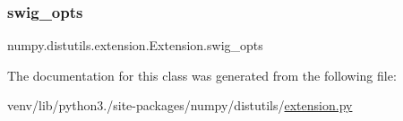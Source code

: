 \subsubsection{\texorpdfstring{swig\+\_\+opts}{swig\_opts}}
{\footnotesize\ttfamily numpy.\+distutils.\+extension.\+Extension.\+swig\+\_\+opts}



The documentation for this class was generated from the following file\+:\begin{DoxyCompactItemize}
\item 
venv/lib/python3./site-\/packages/numpy/distutils/\hyperlink{numpy_2distutils_2extension_8py}{extension.\+py}\end{DoxyCompactItemize}
